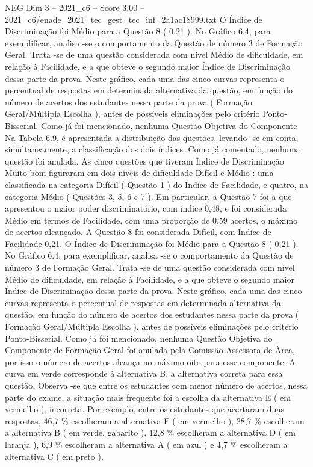 \begin{textsample}{NEG Dim 3 – 2021\_c6 – Score 3.00 – 2021\_c6/enade\_2021\_tec\_gest\_tec\_inf\_2a1ac18999.txt}
O Índice de Discriminação foi Médio para a Questão 8 ( 0,21 ).
No Gráfico 6.4, para exemplificar, analisa -se o comportamento da Questão de número 3 de Formação Geral.
Trata -se de uma questão considerada com nível Médio de dificuldade, em relação à Facilidade, e a que obteve o segundo maior Índice de Discriminação dessa parte da prova.
Neste gráfico, cada uma das cinco curvas representa o percentual de respostas em determinada alternativa da questão, em função do número de acertos dos estudantes nessa parte da prova ( Formação Geral/Múltipla Escolha ), antes de possíveis eliminações pelo critério Ponto-Bisserial.
Como já foi mencionado, nenhuma Questão Objetiva do Componente Na Tabela 6.9, é apresentada a distribuição das questões, levando -se em conta, simultaneamente, a classificação dos dois índices.
Como já comentado, nenhuma questão foi anulada.
As cinco questões que tiveram Índice de Discriminação Muito bom figuraram em dois níveis de dificuldade Difícil e Médio : uma classificada na categoria Difícil ( Questão 1 ) do Índice de Facilidade, e quatro, na categoria Médio ( Questões 3, 5, 6 e 7 ).
Em particular, a Questão 7 foi a que apresentou o maior poder discriminatório, com índice 0,48, e foi considerada Médio em termos de Facilidade, com uma proporção de 0,59 acertos, o máximo de acertos alcançado.
A Questão 8 foi considerada Difícil, com Índice de Facilidade 0,21.
O Índice de Discriminação foi Médio para a Questão 8 ( 0,21 ).
No Gráfico 6.4, para exemplificar, analisa -se o comportamento da Questão de número 3 de Formação Geral.
Trata -se de uma questão considerada com nível Médio de dificuldade, em relação à Facilidade, e a que obteve o segundo maior Índice de Discriminação dessa parte da prova.
Neste gráfico, cada uma das cinco curvas representa o percentual de respostas em determinada alternativa da questão, em função do número de acertos dos estudantes nessa parte da prova ( Formação Geral/Múltipla Escolha ), antes de possíveis eliminações pelo critério Ponto-Bisserial.
Como já foi mencionado, nenhuma Questão Objetiva do Componente de Formação Geral foi anulada pela Comissão Assessora de Área, por isso o número de acertos alcança no máximo oito para esse componente.
A curva em verde corresponde à alternativa B, a alternativa correta para essa questão.
Observa -se que entre os estudantes com menor número de acertos, nessa parte do exame, a situação mais frequente foi a escolha da alternativa E ( em vermelho ), incorreta.
Por exemplo, entre os estudantes que acertaram duas respostas, 46,7 \% escolheram a alternativa E ( em vermelho ), 28,7 \% escolheram a alternativa B ( em verde, gabarito ), 12,8 \% escolheram a alternativa D ( em laranja ), 6,9 \% escolheram a alternativa A ( em azul ) e 4,7 \% escolheram a alternativa C ( em preto ).

\end{textsample}

